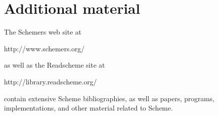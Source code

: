 \chapter{Additional material}

The Schemers web site at
\begin{center}
{\cf http://www.schemers.org/}
\end{center}
as well as the Readscheme site at
\begin{center}
{\cf http://library.readscheme.org/}
\end{center}
contain extensive Scheme bibliographies, as well as papers,
programs, implementations, and other material related to Scheme.

